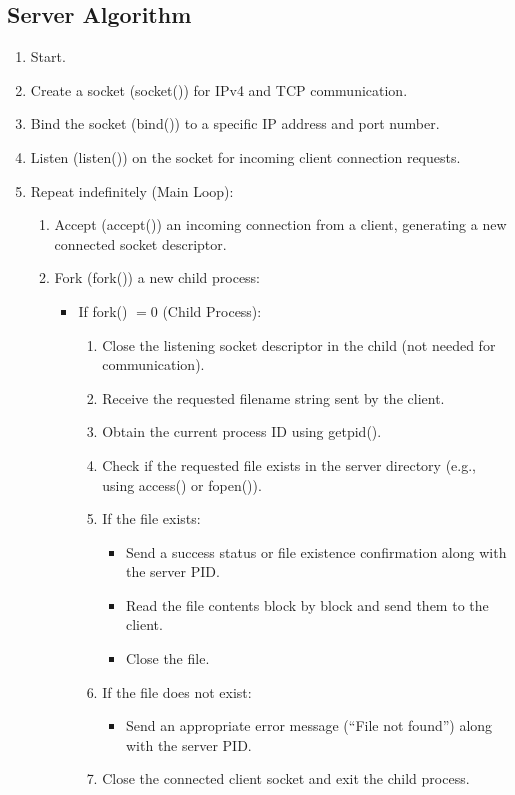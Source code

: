 \documentclass[12pt,a4paper]{article}
\begin{document}
	\subsection*{Server Algorithm}
	\begin{enumerate}
		\item Start.
		\item Create a socket (socket()) for IPv4 and TCP communication.
		\item Bind the socket (bind()) to a specific IP address and port number.
		\item Listen (listen()) on the socket for incoming client connection requests.
		\item Repeat indefinitely (Main Loop):
		\begin{enumerate}
			\item Accept (accept()) an incoming connection from a client, generating a new connected socket descriptor.
			\item Fork (fork()) a new child process:
			\begin{itemize}
				\item If fork() $= 0$ (Child Process):
				\begin{enumerate}
					\item Close the listening socket descriptor in the child (not needed for communication).
					\item Receive the requested filename string sent by the client.
					\item Obtain the current process ID using getpid().
					\item Check if the requested file exists in the server directory (e.g., using access() or fopen()).
					\item If the file exists:
					\begin{itemize}
						\item Send a success status or file existence confirmation along with the server PID.
						\item Read the file contents block by block and send them to the client.
						\item Close the file.
					\end{itemize}
					\item If the file does not exist:
					\begin{itemize}
						\item Send an appropriate error message (``File not found'') along with the server PID.
					\end{itemize}
					\item Close the connected client socket and exit the child process.

\end{enumerate}
\end{itemize}
\end{enumerate}
\end{enumerate}
\end{document}
